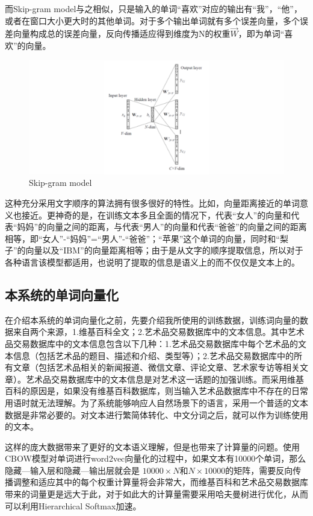 而Skip-gram model与之相似，只是输入的单词“喜欢”对应的输出有“我”，“他”，或者在窗口大小更大时的其他单词。对于多个输出单词就有多个误差向量，多个误差向量构成总的误差向量，反向传播适应得到维度为N的权重$\vec{W}$，即为单词“喜欢”的向量。

\begin{figure}[!htbp]
\centering
\includegraphics[width=\linewidth,keepaspectratio]{data/chapter-1/Capture2-276x300.png}
\caption{Skip-gram model}
\label{figure:Skip-gram网络结构}
\end{figure}

这种充分采用文字顺序的算法拥有很多很好的特性。比如，向量距离接近的单词意义也接近。更神奇的是，在训练文本多且全面的情况下，代表“女人”的向量和代表“妈妈”的向量之间的距离，与代表“男人”的向量和代表“爸爸”的向量之间的距离相等，即“女人”-“妈妈”=“男人”-“爸爸”；“苹果”这个单词的向量，同时和“梨子”的向量以及“IBM”的向量距离相等；由于是从文字的顺序提取信息，所以对于各种语言该模型都适用，也说明了提取的信息是语义上的而不仅仅是文本上的。

\subsection{本系统的单词向量化}

在介绍本系统的单词向量化之前，先要介绍我所使用的训练数据，训练词向量的数据来自两个来源，1.维基百科全文；2.艺术品交易数据库中的文本信息。其中艺术品交易数据库中的文本信息包含以下几种：1.艺术品交易数据库中每个艺术品的文本信息（包括艺术品的题目、描述和介绍、类型等）；2.艺术品交易数据库中的所有文章（包括艺术品相关的新闻报道、微信文章、评论文章、艺术家专访等相关文章）。艺术品交易数据库中的文本信息是对艺术这一话题的加强训练。而采用维基百科的原因是，如果没有维基百科数据库，则当输入艺术品数据库中不存在的日常用语时就无法理解。为了系统能够响应人自然场景下的语言，采用一个普适的文本数据是非常必要的。对文本进行繁简体转化、中文分词之后，就可以作为训练使用的文本。

这样的庞大数据带来了更好的文本语义理解，但是也带来了计算量的问题。使用CBOW模型对单词进行word2vec向量化的过程中，如果文本有10000个单词，那么隐藏—输入层和隐藏—输出层就会是 ${10000}\times{N}$和${N}\times{10000}$的矩阵，需要反向传播调整和适应其中的每个权重计算量将会非常大，而维基百科和艺术品交易数据库带来的词量更是远大于此，对于如此大的计算量需要采用哈夫曼树进行优化，从而可以利用Hierarchical Softmax加速。\cite{DBLP:journals/corr/abs-1801-09797}

